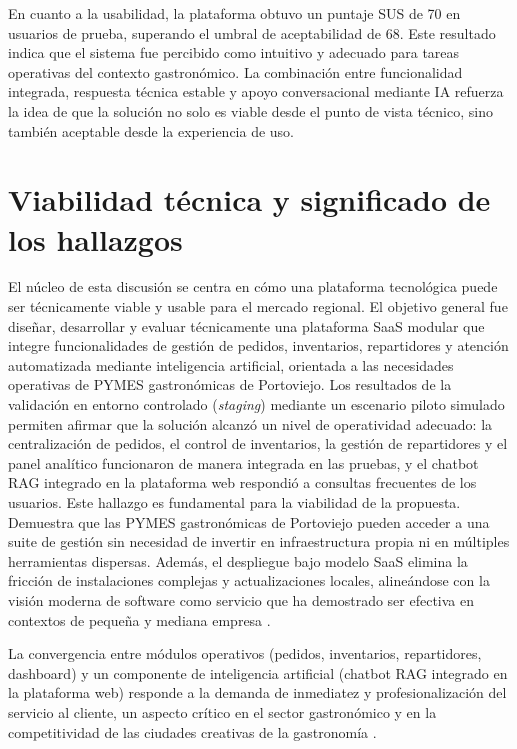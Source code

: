 En cuanto a la usabilidad, la plataforma obtuvo un puntaje SUS de 70 en usuarios de prueba, superando el umbral de aceptabilidad de 68. Este resultado indica que el sistema fue percibido como intuitivo y adecuado para tareas operativas del contexto gastronómico. La combinación entre funcionalidad integrada, respuesta técnica estable y apoyo conversacional mediante IA refuerza la idea de que la solución no solo es viable desde el punto de vista técnico, sino también aceptable desde la experiencia de uso.

\section{Viabilidad técnica y significado de los hallazgos}

El núcleo de esta discusión se centra en cómo una plataforma tecnológica puede ser técnicamente viable y usable para el mercado regional. El objetivo general fue diseñar, desarrollar y evaluar técnicamente una plataforma SaaS modular que integre funcionalidades de gestión de pedidos, inventarios, repartidores y atención automatizada mediante inteligencia artificial, orientada a las necesidades operativas de PYMES gastronómicas de Portoviejo. Los resultados de la validación en entorno controlado (\textit{staging}) mediante un escenario piloto simulado permiten afirmar que la solución alcanzó un nivel de operatividad adecuado: la centralización de pedidos, el control de inventarios, la gestión de repartidores y el panel analítico funcionaron de manera integrada en las pruebas, y el chatbot RAG integrado en la plataforma web respondió a consultas frecuentes de los usuarios. Este hallazgo es fundamental para la viabilidad de la propuesta. Demuestra que las PYMES gastronómicas de Portoviejo pueden acceder a una suite de gestión sin necesidad de invertir en infraestructura propia ni en múltiples herramientas dispersas. Además, el despliegue bajo modelo SaaS elimina la fricción de instalaciones complejas y actualizaciones locales, alineándose con la visión moderna de software como servicio que ha demostrado ser efectiva en contextos de pequeña y mediana empresa \parencite{GonzalezMartinez2021}.

La convergencia entre módulos operativos (pedidos, inventarios, repartidores, dashboard) y un componente de inteligencia artificial (chatbot RAG integrado en la plataforma web) responde a la demanda de inmediatez y profesionalización del servicio al cliente, un aspecto crítico en el sector gastronómico y en la competitividad de las ciudades creativas de la gastronomía \parencite{Castells2010}.

